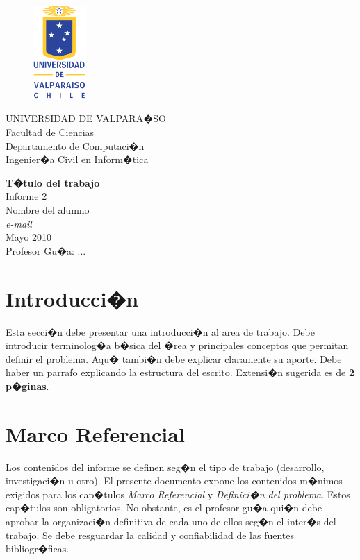 \documentclass[12pt,a4paper]{article}
\begin{document}
\begin{center}
\begin{figure}[ht]
\begin{center}
\includegraphics[width=2cm]{logoUV.eps}
\end{center}
\end{figure}
UNIVERSIDAD DE VALPARA�SO \\
Facultad de Ciencias \\
Departamento de Computaci�n \\
Ingenier�a Civil  en Inform�tica

\vspace{1cm} \Large
\textbf{T�tulo del trabajo} \\
\large
Informe 2 \\
Nombre del alumno\\
\normalsize
\emph{e-mail} \\
Mayo 2010 \\
\vspace{1cm}
Profesor Gu�a: ...
\end{center}

\newpage

\tableofcontents

\newpage

\section{Introducci�n}
\label{intr}

Esta secci�n debe presentar una introducci�n al area de trabajo.
Debe introducir terminolog�a b�sica del �rea y principales conceptos
que permitan definir el problema. Aqu� tambi�n debe explicar claramente su aporte.
 Debe haber un parrafo explicando la estructura del escrito.
Extensi�n sugerida  es de
\textbf{2 p�ginas}.


\section{Marco Referencial}
\label{marco}


Los contenidos del informe se definen seg�n el tipo de
trabajo (desarrollo, investigaci�n u otro). El presente documento expone
los contenidos m�nimos exigidos para los cap�tulos \emph{Marco
Referencial} y \emph{Definici�n del problema}. Estos cap�tulos son
obligatorios. No obstante, es el profesor gu�a qui�n debe aprobar la
organizaci�n definitiva de cada uno de ellos seg�n el inter�s del
trabajo. Se debe resguardar la calidad y confiabilidad de las
fuentes bibliogr�ficas.
\end{document}
